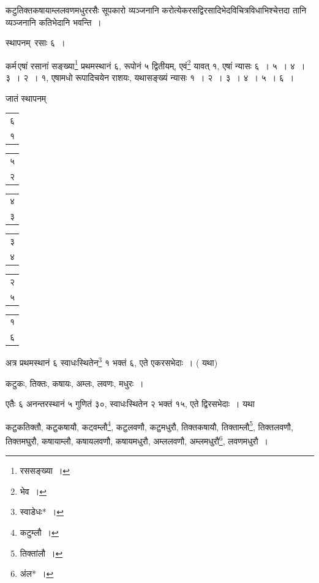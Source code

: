\documentclass[10pt, openany]{book}
\begin{document}
{{{कटुतिक्तकषायाम्ललवणमधुररसैः सूपकारो व्यञ्जनानि करोत्येकरसद्विरसादिभेदविचित्रविधाभिश्चेत्तदा तानि व्यञ्जनानि कतिभेदानि भवन्ति~।}
\vspace{2mm}

{स्थापनम्\textendash \,\hspace{4mm} रसाः ६~।}
\vspace{2mm}

{कर्म\textendash \,एषां रसानां सङ्ख्या\renewcommand{\thefootnote}{\s ३}\footnote{\s रससङ्ख्या~।} प्रथमस्थानं ६, रूपोनं ५ द्वितीयम्,
एवं\renewcommand{\thefootnote}{\s ४}\footnote{\s भेव~।} यावत् १, एषां}
{न्यासः ६~। ५~। ४~। ३~। २~। १, एषामधो रूपादिचयेन राशयः, यथासङ्ख्यं
न्यासः १~। २~।}
{३~। ४~। ५~। ६~।}
\vspace{2mm}

{जातं स्थापनम्\textendash \,\hspace{2mm} \begin{tabular}{r|}६ \\ १ \end{tabular}\begin{tabular}{r|} ५  \\ २\end{tabular}\begin{tabular}{r|} ४ \\ ३  \end{tabular}\begin{tabular}{r|}  ३ \\ ४  \end{tabular}\begin{tabular}{r|} २\\ ५   \end{tabular}\begin{tabular}{r} १ \\  ६ \end{tabular}
\vspace{2mm}

{अत्र प्रथमस्थानं ६ स्वाधःस्थितेन\renewcommand{\thefootnote}{\s ५}\footnote{\s स्वाडेधः*~।} १ भक्तं ६, एते एकरसभेदाः~। (
यथा\textemdash)}
\vspace{2mm}

{कटुकः, तिक्तः, कषायः, अम्लः, लवणः, मधुरः~।}
\vspace{2mm}

{एतैः ६ अनन्तरस्थानं ५ गुणितं ३०, स्वाधःस्थितेन २ भक्तं १५, एते
द्विरसभेदाः~।}
{यथा\textemdash}
\vspace{2mm}

{कटुकतिक्तौ, कटुकषायौ, कट्वम्लौ\renewcommand{\thefootnote}{\s ६}\footnote{\s कटुम्लौ~।}, कटुलवणौ, कटुमधुरौ, तिक्तकषायौ,
तिक्ताम्लौ\renewcommand{\thefootnote}{\s ७}\footnote{\s तिक्तांलौ~।},}
{तिक्तलवणौ, तिक्तमघुरौ, कषायाम्लौ, कषायलवणौ, कषायमधुरौ, अम्ललवणौ,
अम्लमधुरौ\renewcommand{\thefootnote}{\s ८}\footnote{\s अंल*~।},}
{लवणमधुरौ~।}
\vspace{-1mm}

}}}
\end{document}
